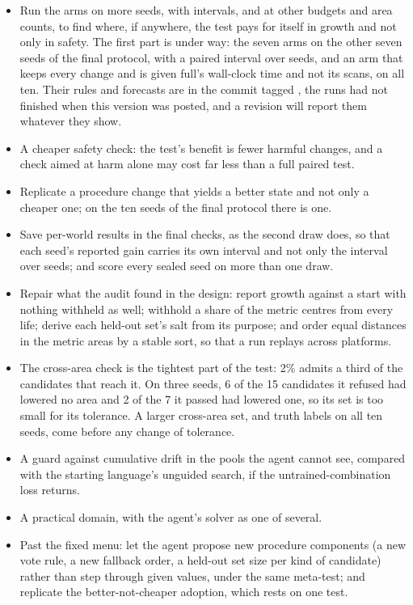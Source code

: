 \documentclass[11pt]{article}
\begin{document}
\begin{itemize}[leftmargin=*]
\item Run the arms on more seeds, with intervals, and at other budgets and area counts, to find where, if anywhere, the test pays for itself in growth and not only in safety. The first part is under way: the seven arms on the other seven seeds of the final protocol, with a paired interval over seeds, and an arm that keeps every change and is given full's wall-clock time and not its scans, on all ten. Their rules and forecasts are in the commit tagged , the runs had not finished when this version was posted, and a revision will report them whatever they show.
\item A cheaper safety check: the test's benefit is fewer harmful changes, and a check aimed at harm alone may cost far less than a full paired test.
\item Replicate a procedure change that yields a better state and not only a cheaper one; on the ten seeds of the final protocol there is one.
\item Save per-world results in the final checks, as the second draw does, so that each seed's reported gain carries its own interval and not only the interval over seeds; and score every sealed seed on more than one draw.
\item Repair what the audit found in the design: report growth against a start with nothing withheld as well; withhold a share of the metric centres from every life; derive each held-out set's salt from its purpose; and order equal distances in the metric areas by a stable sort, so that a run replays across platforms.
\item The cross-area check is the tightest part of the test: 2\% admits a third of the candidates that reach it. On three seeds, 6 of the 15 candidates it refused had lowered no area and 2 of the 7 it passed had lowered one, so its set is too small for its tolerance. A larger cross-area set, and truth labels on all ten seeds, come before any change of tolerance.
\item A guard against cumulative drift in the pools the agent cannot see, compared with the starting language's unguided search, if the untrained-combination loss returns.
\item A practical domain, with the agent's solver as one of several.
\item Past the fixed menu: let the agent propose new procedure components (a new vote rule, a new fallback order, a held-out set size per kind of candidate) rather than step through given values, under the same meta-test; and replicate the better-not-cheaper adoption, which rests on one test.
\end{itemize}
\end{document}
